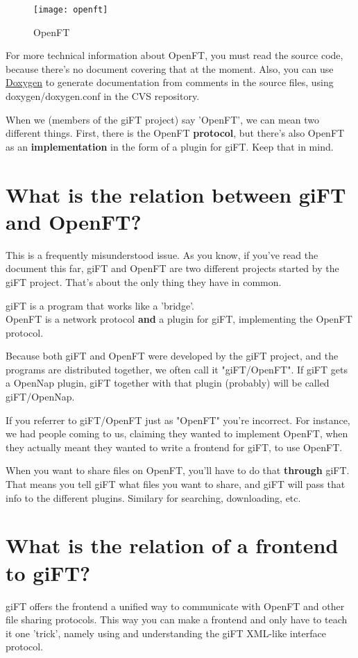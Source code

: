 \documentclass[10pt]{article}
\begin{document}
\begin{figure}[ht]
  \begin{center}
    \texttt{[image: openft]}
  \end{center}
  \caption{OpenFT}
\end{figure}

For more technical information about OpenFT, you must read the source code,
because there's no document covering that at the moment. Also, you can use
\href{http://doxygen.org}{Doxygen} to generate documentation from comments in
the source files, using doxygen/doxygen.conf in the CVS repository.

When we (members of the giFT project) say 'OpenFT', we can mean two different
things. First, there is the OpenFT \textbf{protocol}, but there's also OpenFT
as an \textbf{implementation} in the form of a plugin for giFT. Keep that in
mind.

\section{What is the relation between giFT and OpenFT?}
This is a frequently misunderstood issue. As you know, if you've read the
document this far, giFT and OpenFT are two different projects started by the
giFT project. That's about the only thing they have in common.

giFT is a program that works like a 'bridge'.\\
OpenFT is a network protocol \textbf{and} a plugin for giFT, implementing the
OpenFT protocol.

Because both giFT and OpenFT were developed by the giFT project, and the
programs are distributed together, we often call it "giFT/OpenFT". If giFT gets
a OpenNap plugin, giFT together with that plugin (probably) will be called
giFT/OpenNap.

If you referrer to giFT/OpenFT just as "OpenFT" you're incorrect. For instance,
we had people coming to us, claiming they wanted to implement OpenFT, when they
actually meant they wanted to write a frontend for giFT, to use OpenFT.

When you want to share files on OpenFT, you'll have to do that \textbf{through}
giFT. That means you tell giFT what files you want to share, and giFT will pass
that info to the different plugins. Similary for searching, downloading, etc.

\section{What is the relation of a frontend to giFT?}
giFT offers the frontend a unified way to communicate with OpenFT and other
file sharing protocols. This way you can make a frontend and only have to teach
it one 'trick', namely using and understanding the giFT XML-like interface
protocol.
\end{document}
